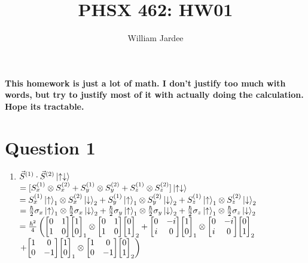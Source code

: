 \documentclass[12pt]{article}
\begin{document}
\title{PHSX 462: HW01}
\author{William Jardee}
\maketitle

{\bf This homework is just a lot of math. I don't justify too much with words, but try to justify most of it with actually doing the calculation. Hope its tractable.}

\section*{Question 1}
\begin{enumerate}[label=\alph*)]
\item
\hspace*{1em}$\vec{S}^{(1)} \cdot \vec{S}^{(2)} \ket{\uparrow \downarrow}$\vspace{0.5em}\\
$=[S_x^{(1)}\otimes S_x^{(2)} + S_y^{(1)}\otimes S_y^{(2)} + S_z^{(1)}\otimes S_z^{(2)}]\ket{\uparrow \downarrow}$\vspace{0.5em}\\
$=S_x^{(1)}\ket{\uparrow}_1\otimes S_x^{(2)}\ket{\downarrow}_2 + S_y^{(1)}\ket{\uparrow}_1\otimes S_y^{(2)}\ket{\downarrow}_2 + S_z^{(1)}\ket{\uparrow}_1\otimes S_z^{(2)}\ket{\downarrow}_2$\vspace{0.5em}\\
$=\frac{\hbar}{2}\sigma_x\ket{\uparrow}_1\otimes \frac{\hbar}{2}\sigma_x\ket{\downarrow}_2 + \frac{\hbar}{2}\sigma_y\ket{\uparrow}_1\otimes \frac{\hbar}{2}\sigma_y\ket{\downarrow}_2 + \frac{\hbar}{2}\sigma_z\ket{\uparrow}_1\otimes \frac{\hbar}{2}\sigma_z\ket{\downarrow}_2$\vspace{0.5em}\\
$=\frac{\hbar^2}{4}\left(\mqty[0 & 1 \\ 1 & 0]\mqty[1\\0]_1\otimes\mqty[0&1 \\1 & 0]\mqty[0\\1]_2 + \mqty[0 & -i \\ i & 0]\mqty[1\\0]_1\otimes\mqty[0& -i \\ i &0]\mqty[0\\1]_2 \right.$\vspace{0.5em}\\
\hspace*{5em}$\left. + \mqty[1 &0\\0 &-1]\mqty[1\\0]_1\otimes\mqty[1 & 0 \\ 0 & -1]\mqty[0\\1]_2\right)$\vspace{0.5em}\\

\end{enumerate}
\end{document}
